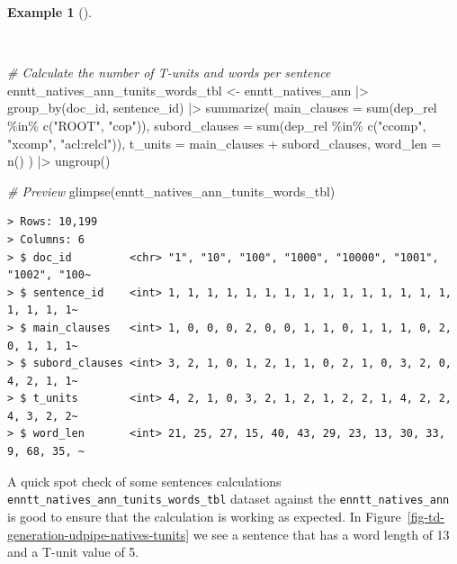 \documentclass[
  letterpaper,
  DIV=11,
  numbers=noendperiod]{scrreport}
\newenvironment{Shaded}{\begin{snugshade}}{\end{snugshade}}
\newcommand{\AttributeTok}[1]{\textcolor[rgb]{0.00,0.00,0.00}{#1}}
\newcommand{\CommentTok}[1]{\textcolor[rgb]{0.00,0.00,0.00}{\textit{#1}}}
\newcommand{\FunctionTok}[1]{\textcolor[rgb]{0.00,0.00,0.00}{#1}}
\newcommand{\NormalTok}[1]{\textcolor[rgb]{0.00,0.00,0.00}{#1}}
\newcommand{\OtherTok}[1]{\textcolor[rgb]{0.00,0.00,0.00}{#1}}
\newcommand{\SpecialCharTok}[1]{\textcolor[rgb]{0.00,0.00,0.00}{#1}}
\newcommand{\StringTok}[1]{\textcolor[rgb]{0.00,0.00,0.00}{#1}}
\theoremstyle{definition}
\newtheorem{example}{Example}[chapter]
\theoremstyle{remark}
\begin{document}
\begin{example}[]\protect\hypertarget{exm-td-generation-udpipe-natives-tunits-words}{}\label{exm-td-generation-udpipe-natives-tunits-words}

~

\begin{Shaded}
\begin{Highlighting}[]
\CommentTok{\# Calculate the number of T{-}units and words per sentence}
\NormalTok{enntt\_natives\_ann\_tunits\_words\_tbl }\OtherTok{\textless{}{-}} 
\NormalTok{  enntt\_natives\_ann }\SpecialCharTok{|\textgreater{}}
  \FunctionTok{group\_by}\NormalTok{(doc\_id, sentence\_id) }\SpecialCharTok{|\textgreater{}}
  \FunctionTok{summarize}\NormalTok{(}
    \AttributeTok{main\_clauses =} \FunctionTok{sum}\NormalTok{(dep\_rel }\SpecialCharTok{\%in\%} \FunctionTok{c}\NormalTok{(}\StringTok{"ROOT"}\NormalTok{, }\StringTok{"cop"}\NormalTok{)),}
    \AttributeTok{subord\_clauses =} \FunctionTok{sum}\NormalTok{(dep\_rel }\SpecialCharTok{\%in\%} \FunctionTok{c}\NormalTok{(}\StringTok{"ccomp"}\NormalTok{, }\StringTok{"xcomp"}\NormalTok{, }\StringTok{"acl:relcl"}\NormalTok{)),}
    \AttributeTok{t\_units =}\NormalTok{ main\_clauses }\SpecialCharTok{+}\NormalTok{ subord\_clauses,}
    \AttributeTok{word\_len =} \FunctionTok{n}\NormalTok{()}
\NormalTok{  ) }\SpecialCharTok{|\textgreater{}}
  \FunctionTok{ungroup}\NormalTok{()}

\CommentTok{\# Preview}
\FunctionTok{glimpse}\NormalTok{(enntt\_natives\_ann\_tunits\_words\_tbl)}
\end{Highlighting}
\end{Shaded}

\begin{verbatim}
> Rows: 10,199
> Columns: 6
> $ doc_id         <chr> "1", "10", "100", "1000", "10000", "1001", "1002", "100~
> $ sentence_id    <int> 1, 1, 1, 1, 1, 1, 1, 1, 1, 1, 1, 1, 1, 1, 1, 1, 1, 1, 1~
> $ main_clauses   <int> 1, 0, 0, 0, 2, 0, 0, 1, 1, 0, 1, 1, 1, 0, 2, 0, 1, 1, 1~
> $ subord_clauses <int> 3, 2, 1, 0, 1, 2, 1, 1, 0, 2, 1, 0, 3, 2, 0, 4, 2, 1, 1~
> $ t_units        <int> 4, 2, 1, 0, 3, 2, 1, 2, 1, 2, 2, 1, 4, 2, 2, 4, 3, 2, 2~
> $ word_len       <int> 21, 25, 27, 15, 40, 43, 29, 23, 13, 30, 33, 9, 68, 35, ~
\end{verbatim}

\end{example}

A quick spot check of some sentences calculations
\texttt{enntt\_natives\_ann\_tunits\_words\_tbl} dataset against the
\texttt{enntt\_natives\_ann} is good to ensure that the calculation is
working as expected. In
Figure~\ref{fig-td-generation-udpipe-natives-tunits} we see a sentence
that has a word length of 13 and a T-unit value of 5.
\end{document}
